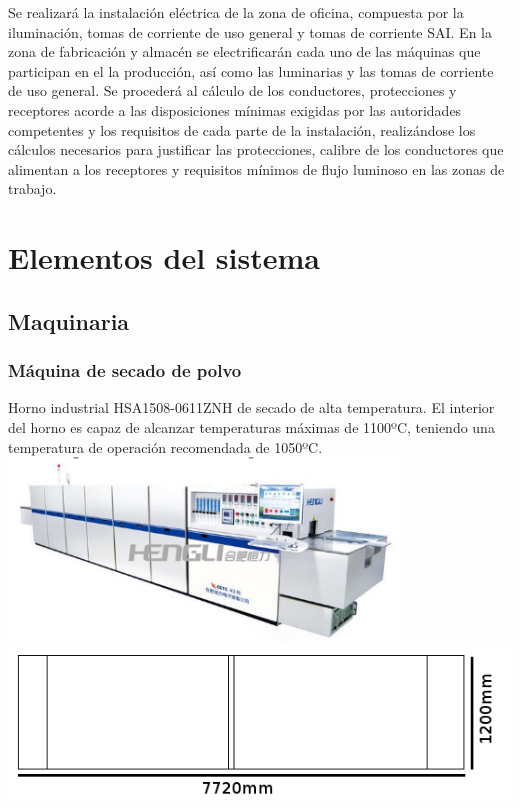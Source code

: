 Se realizará la instalación eléctrica de la zona de oficina, compuesta por la iluminación, tomas de corriente de uso general y tomas de corriente SAI. En la zona de fabricación y almacén se electrificarán cada uno de las máquinas que participan en el la producción, así como las luminarias y las tomas de corriente de uso general. Se procederá al cálculo de los conductores, protecciones y receptores acorde a las disposiciones mínimas exigidas por las autoridades competentes y los requisitos de cada parte de la instalación, realizándose los cálculos necesarios para justificar las protecciones, calibre de los conductores que alimentan a los receptores y requisitos mínimos de flujo luminoso en las zonas de trabajo.

\pagebreak

\section{Elementos del sistema}
\subsection{Maquinaria}
	\subsubsection{Máquina de secado de polvo}

	

	Horno industrial HSA1508-0611ZNH de secado de alta temperatura. El interior del horno es capaz de alcanzar temperaturas máximas de 1100ºC, teniendo una temperatura de operación recomendada de 1050ºC.\\

	\includegraphics[scale=0.5]{Datasheets/1HornoFoto.png} 
	\includegraphics[scale=0.5]{Datasheets/Miniaturas/horno.png}\\

